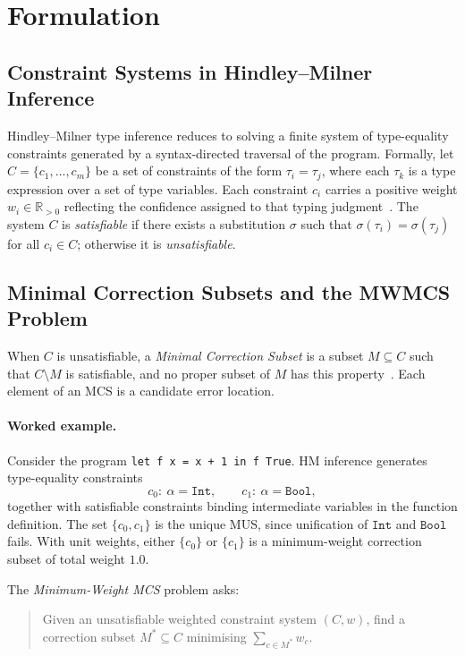 \section{Formulation}

\subsection{Constraint Systems in Hindley--Milner Inference}

Hindley--Milner type inference reduces to solving a finite system of
type-equality constraints generated by a syntax-directed traversal of the
program.
Formally, let $C = \{c_1, \ldots, c_m\}$ be a set of constraints of the form
$\tau_i = \tau_j$, where each $\tau_k$ is a type expression over a set of type
variables.
Each constraint $c_i$ carries a positive weight $w_i \in \mathbb{R}_{>0}$
reflecting the confidence assigned to that typing judgment~\cite{pavlinovic2014}.
The system $C$ is \emph{satisfiable} if there exists a substitution $\sigma$
such that $\sigma(\tau_i) = \sigma(\tau_j)$ for all $c_i \in C$; otherwise it
is \emph{unsatisfiable}.

\subsection{Minimal Correction Subsets and the MWMCS Problem}

When $C$ is unsatisfiable, a \emph{Minimal Correction Subset} is a
subset $M \subseteq C$ such that $C \setminus M$ is satisfiable, and no proper
subset of $M$ has this property~\cite{marques-silva2013}.
Each element of an MCS is a candidate error location.

\paragraph{Worked example.} Consider the program \texttt{let f x = x + 1 in f True}. HM inference
generates type-equality constraints
\[
c_0:\ \alpha = \mathtt{Int}, \qquad
c_1:\ \alpha = \mathtt{Bool},
\]
together with satisfiable constraints binding intermediate variables in the
function definition. The set $\{c_0, c_1\}$ is the unique MUS, since
unification of $\mathtt{Int}$ and $\mathtt{Bool}$ fails. With unit weights,
either $\{c_0\}$ or $\{c_1\}$ is a minimum-weight correction subset of total
weight $1.0$.

The \emph{Minimum-Weight MCS} problem asks:
\begin{quote}
  Given an unsatisfiable weighted constraint system $(C, w)$, find a correction
  subset $M^* \subseteq C$ minimising $\sum_{c \in M^*} w_c$.
\end{quote}

